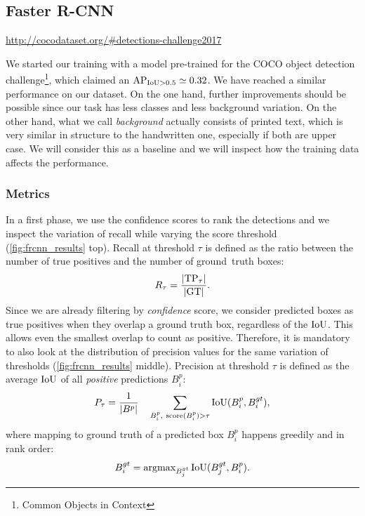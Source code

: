 	\subsection{Faster R-CNN}\label{sec:frcnn_results}
		\urldef{\cocoURL}\url{http://cocodataset.org/#detections-challenge2017}

		We started our training with a model pre-trained for the COCO object detection challenge\footnote{Common Objects in Context \cocoURL}, which claimed an \(\operatorname{\operatorname{AP}_{\operatorname{IoU} > 0.5}} \simeq 0.32\). We have reached a similar performance on our  dataset. On the one hand, further improvements should be possible since our task has less classes and less background variation. On the other hand, what we call \emph{background} actually consists of printed text, which is very similar in structure to the handwritten one, especially if both are upper case. We will consider this as a baseline and we will inspect how the training data affects the performance.

		\subsubsection*{Metrics}
			In a first phase, we use the confidence scores to rank the detections and we inspect the variation of recall while varying the score threshold (\autoref{fig:frcnn_results} top). Recall at threshold \(\tau\) is defined as the ratio between the number of true positives and the number of \mbox{ground truth} boxes:
			\[
				R_{\tau} = \frac{\left\vert\operatorname{TP}_\tau\right\vert}{\left\vert\operatorname{GT}\right\vert}.
			\]
			Since we are already filtering by \emph{confidence} score, we consider predicted boxes as true positives when they overlap a ground truth box, regardless of the \(\operatorname{IoU}\). This allows even the smallest overlap to count as positive. Therefore, it is mandatory to also look at the distribution of precision values for the same variation of thresholds (\autoref{fig:frcnn_results} middle). Precision at threshold \(\tau\) is defined as the average \(\operatorname{IoU}\) of all \emph{positive} predictions \(B^p_i\):
			\[
					P_\tau = \frac{1}{\left\vert B^p\right\vert}~~~ \sum_{B^p_i,\ \operatorname{score}(B^p_i ) > \tau} \operatorname{IoU}(B^p_i, B^{gt}_i),
			\]
			where mapping to ground truth of a predicted box \(B^p_i\) happens greedily and in rank order:
			\[
					B^{gt}_i = \operatorname{argmax}_{B^{gt}_j} \operatorname{IoU}(B^{gt}_j, B^p_i).
			\]

